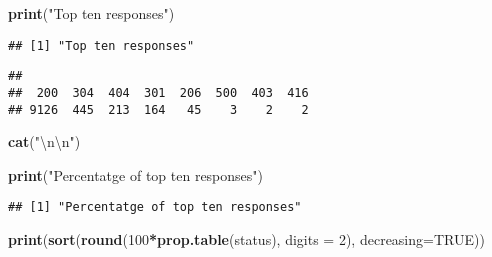 \documentclass[]{article}
\newenvironment{Shaded}{\begin{snugshade}}{\end{snugshade}}
\newcommand{\CharTok}[1]{\textcolor[rgb]{0.31,0.60,0.02}{#1}}
\newcommand{\DataTypeTok}[1]{\textcolor[rgb]{0.13,0.29,0.53}{#1}}
\newcommand{\DecValTok}[1]{\textcolor[rgb]{0.00,0.00,0.81}{#1}}
\newcommand{\KeywordTok}[1]{\textcolor[rgb]{0.13,0.29,0.53}{\textbf{#1}}}
\newcommand{\NormalTok}[1]{#1}
\newcommand{\OperatorTok}[1]{\textcolor[rgb]{0.81,0.36,0.00}{\textbf{#1}}}
\newcommand{\OtherTok}[1]{\textcolor[rgb]{0.56,0.35,0.01}{#1}}
\newcommand{\StringTok}[1]{\textcolor[rgb]{0.31,0.60,0.02}{#1}}
\begin{document}
\begin{Shaded}
\begin{Highlighting}[]
\KeywordTok{print}\NormalTok{(}\StringTok{"Top ten responses"}\NormalTok{)}
\end{Highlighting}
\end{Shaded}

\begin{verbatim}
## [1] "Top ten responses"
\end{verbatim}

\begin{Shaded}
\end{Shaded}

\begin{verbatim}
## 
##  200  304  404  301  206  500  403  416 
## 9126  445  213  164   45    3    2    2
\end{verbatim}

\begin{Shaded}
\begin{Highlighting}[]
\KeywordTok{cat}\NormalTok{(}\StringTok{"}\CharTok{\textbackslash{}n\textbackslash{}n}\StringTok{"}\NormalTok{)}
\end{Highlighting}
\end{Shaded}

\begin{Shaded}
\begin{Highlighting}[]
\KeywordTok{print}\NormalTok{(}\StringTok{"Percentatge of top ten responses"}\NormalTok{)}
\end{Highlighting}
\end{Shaded}

\begin{verbatim}
## [1] "Percentatge of top ten responses"
\end{verbatim}

\begin{Shaded}
\begin{Highlighting}[]
\KeywordTok{print}\NormalTok{(}\KeywordTok{sort}\NormalTok{(}\KeywordTok{round}\NormalTok{(}\DecValTok{100}\OperatorTok{*}\KeywordTok{prop.table}\NormalTok{(status), }\DataTypeTok{digits =} \DecValTok{2}\NormalTok{), }\DataTypeTok{decreasing=}\OtherTok{TRUE}\NormalTok{))}
\end{Highlighting}
\end{Shaded}
\end{document}
